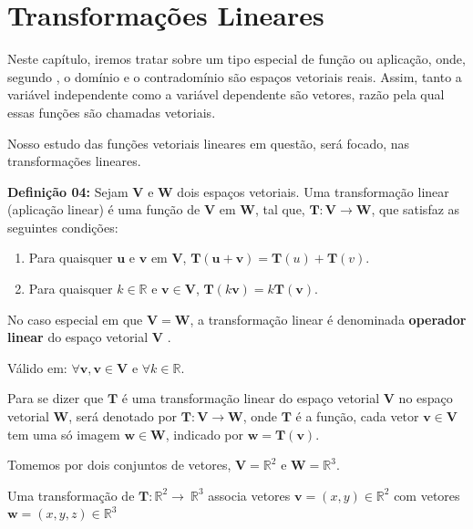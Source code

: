 \chapter{Transformações Lineares}
Neste capítulo, iremos tratar sobre um tipo especial de função ou aplicação, onde, segundo \cite{steinbruch1987}, o domínio e o contradomínio são espaços vetoriais reais. Assim, tanto a variável independente como a variável dependente são vetores, razão pela qual essas funções são chamadas vetoriais.

Nosso estudo das funções vetoriais lineares em questão, será focado, nas transformações lineares.

\noindent\textbf{Definição 04:} Sejam $\mathbf{V}$ e $\mathbf{W}$ dois espaços vetoriais. Uma transformação linear (aplicação linear) é uma função de $\mathbf{V}$ em $\mathbf{W}$, tal que, $\mathbf{T}: \mathbf{V} \rightarrow \mathbf{W}$, que satisfaz as seguintes condições:

\begin{enumerate}
	\item Para quaisquer $\mathbf{u}$ e $\mathbf{v}$ em $\mathbf{V}$, $\mathbf{T}(\mathbf{u} + \mathbf{v}) = \mathbf{T}(u) + \mathbf{T}(v)$.
	\item Para quaisquer $k \in \mathbb{R}$ e $\mathbf{v} \in \mathbf{V}$, $\mathbf{T}(k\mathbf{v}) = k\mathbf{T}(\mathbf{v})$.
\end{enumerate}

No caso especial em que $\mathbf{V} = \mathbf{W}$, a transformação linear é denominada \textbf{operador linear} do espaço vetorial $\mathbf{V}$ \cite{anton2010elementary}.

\noindent\centerline{Válido em: $\forall \mathbf{v}, \mathbf{v} \in \mathbf{V}$ e $\forall k \in \mathbb{R}$. }

Para se dizer que $\mathbf{T}$ é uma transformação linear do espaço vetorial $\mathbf{V}$ no espaço vetorial $\mathbf{W}$, será denotado por $\mathbf{T}:\mathbf{V}\longrightarrow\mathbf{W}$, onde $\mathbf{T}$ é a função, cada vetor $\mathbf{v} \in \mathbf{V}$ tem uma só imagem $\mathbf{w} \in \mathbf{W}$, indicado por $\mathbf{w} = \mathbf{T}(\mathbf{v})$.

Tomemos por dois conjuntos de vetores, $\mathbf{V} = \mathbb{R}^2$ e $\mathbf{W} = \mathbb{R}^3$.

Uma transformação de $\mathbf{T}:\mathbb{R}^2\longrightarrow\ \mathbb{R}^3$ associa vetores $\mathbf{v} = (x, y) \in \mathbb{R}^2$ com vetores $\mathbf{w} = (x, y, z) \in \mathbb{R}^3$

